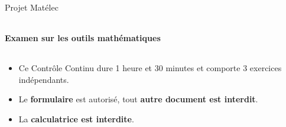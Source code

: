 \documentclass[10pt,a4paper]{report}
\begin{document}
\begin{center}
{\Large Projet Matélec }
 \begin{tabularx}{\linewidth}{c}
\hline
\end{tabularx}
\end{center}
\begin{center}
{\Large \textbf{Examen sur les outils mathématiques}\\}
\end{center}
 \begin{tabularx}{\linewidth}{c}
\hline
\end{tabularx}
\setcounter{chapter}{1}

\bigskip

\begin{itemize}
	\item Ce Contrôle Continu dure 1 heure et 30 minutes et comporte 3 exercices indépendants.
	\item Le \textbf{formulaire} est autorisé, tout \textbf{autre document est interdit}.
	\item La \textbf{calculatrice est interdite}.
\end{itemize}

\bigskip




\newpage

\end{document}
